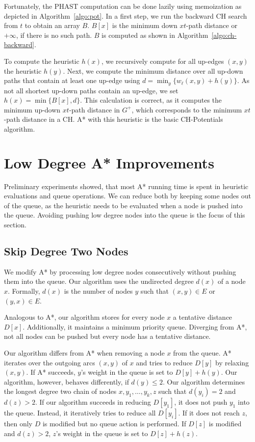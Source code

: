 \documentclass[letterpaper]{article} %
\begin{document}
Fortunately, the PHAST computation can be done lazily using memoization as depicted in Algorithm~\ref{algo:pot}.
In a first step, we run the backward CH search from $t$ to obtain an array $B$.
$B[x]$ is the minimum down $xt$-path distance or $+\infty$, if there is no such path.
$B$ is computed as shown in Algorithm~\ref{algo:ch-backward}.

To compute the heuristic $h(x)$, we recursively compute for all up-edges $(x,y)$ the heuristic $h(y)$.
Next, we compute the minimum distance over all up-down paths that contain at least one up-edge using $d = \min_y\{w_\ell(x,y) + h(y)\}$.
As not all shortest up-down paths contain an up-edge, we set $h(x) = \min \{ B[x], d \}$.
This calculation is correct, as it computes the minimum up-down $xt$-path distance in $G^+$, which corresponds to the minimum $xt$-path distance in a CH.
A* with this heuristic is the basic CH-Potentials algorithm.

\section{Low Degree A* Improvements}

\label{sec:low-deg-improvment}

Preliminary experiments showed, that most A* running time is spent in heuristic evaluations and queue operations. %
We can reduce both by keeping some nodes out of the queue, as the heuristic needs to be evaluated when a node is pushed into the queue.
Avoiding pushing low degree nodes into the queue is the focus of this section.

\subsection{Skip Degree Two Nodes}

We modify A* by processing low degree nodes consecutively without pushing them into the queue.
Our algorithm uses the undirected degree $d(x)$ of a node $x$.
Formally, $d(x)$ is the number of nodes $y$ such that $(x,y)\in E$ or $(y,x)\in E$.

Analogous to A*, our algorithm stores for every node $x$ a tentative distance $D[x]$.
Additionally, it maintains a minimum priority queue.
Diverging from A*, not all nodes can be pushed but every node has a tentative distance.

Our algorithm differs from A* when removing a node $x$ from the queue.
A* iterates over the outgoing arcs $(x,y)$ of $x$ and tries to reduce $D[y]$ by relaxing $(x,y)$.
If A* succeeds, $y$'s weight in the queue is set to $D[y]+h(y)$.
Our algorithm, however, behaves differently, if $d(y)\le 2$.
Our algorithm determines the longest degree two chain of nodes $x,y_1,\ldots, y_k, z$ such that $d(y_i)=2$ and $d(z) > 2$.
If our algorithm succeeds in reducing $D[y_1]$, it does not push $y_1$ into the queue.
Instead, it iteratively tries to reduce all $D[y_i]$.
If it does not reach $z$, then only $D$ is modified but no queue action is performed.
If $D[z]$ is modified and $d(z)>2$, $z$'s weight in the queue is set to $D[z]+h(z)$.
\end{document}
